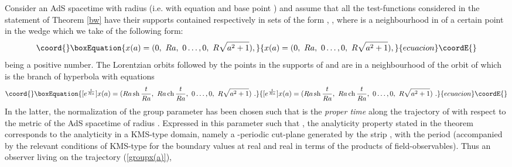 \documentclass[a4paper,a4paper]{article}
\def\Im{{\rm Im\,}}
\def\ch{{\rm ch\,}}
\def\sh{{\rm sh\,}}
\begin{document}
Consider an AdS spacetime with radius \coordHE{} (i.e.
with equation \coordHE{} and base point \coordHE{})
and assume that all the test-functions
\coordHE{} considered in the statement of Theorem \ref{bw}
have their supports contained respectively in sets of the form
\coordHE{},
\coordHE{}, where \coordHE{} is a neighbourhood in \coordHE{}
of a certain point \coordHE{} in the wedge \coordHE{}
which we take of the following form:
\begin{equation}\coord{}\boxEquation{
x(a) = (0,\ R a,\ 0\ldots,0,\ R \sqrt {a^2+1}),
\label{x(a)} }{
x(a) = (0,\ R a,\ 0\ldots,0,\ R \sqrt {a^2+1}),
}{ecuacion}\coordE{}\end{equation}
\coordHE{} being a positive number.
The Lorentzian orbits followed by the points in the supports of
\coordHE{} and \coordHE{} are in a neighbourhood of the orbit of \coordHE{}
which is the branch of hyperbola with equations
\begin{equation}\coord{}\boxEquation{
[e^{t\over Ra}]x(a) = (Ra\,\sh {t\over Ra},\
Ra\,\ch {t\over Ra},\
0\ldots,0,\ R \sqrt {a^2+1})\ .
\label{groupx(a)}}{
[e^{t\over Ra}]x(a) = (Ra\,\sh {t\over Ra},\
Ra\,\ch {t\over Ra},\
0\ldots,0,\ R \sqrt {a^2+1})\ .
}{ecuacion}\coordE{}\end{equation}
In the latter, the normalization of the group parameter \coordHE{}
has been chosen such that \coordHE{} is the
{\sl proper time} along the trajectory of \coordHE{} with respect
to the metric of the AdS spacetime of radius \coordHE{}.
Expressed in this parameter \myHighlight{$t$}\coordHE{} such that
\myHighlight{$\lambda = e^{t\over Ra}$}\coordHE{},
the analyticity property stated in the theorem corresponds
to the analyticity in a KMS-type domain, namely a
\myHighlight{$\beta$}\coordHE{}-periodic cut-plane generated by
the strip \myHighlight{$\{t; \ 0<\Im t< \beta\}$}\coordHE{},
with the period \myHighlight{$i\beta = 2i\pi \ aR$}\coordHE{} (accompanied by the
relevant conditions of KMS-type for the
boundary values at \myHighlight{$t$}\coordHE{} real and \coordHE{} real
in terms of the products of field-observables).
Thus an
observer living on the trajectory (\ref{groupx(a)}),
\end{document}

